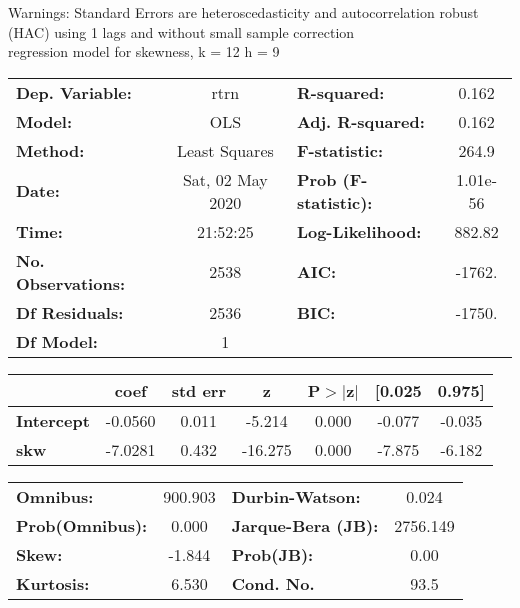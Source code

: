 Warnings: \newline
 [1] Standard Errors are heteroscedasticity and autocorrelation robust (HAC) using 1 lags and without small sample correction\\ 

regression model for skewness, k = 12 h = 9\begin{center}
\begin{tabular}{lclc}
\toprule
\textbf{Dep. Variable:}    &       rtrn       & \textbf{  R-squared:         } &     0.162   \\
\textbf{Model:}            &       OLS        & \textbf{  Adj. R-squared:    } &     0.162   \\
\textbf{Method:}           &  Least Squares   & \textbf{  F-statistic:       } &     264.9   \\
\textbf{Date:}             & Sat, 02 May 2020 & \textbf{  Prob (F-statistic):} &  1.01e-56   \\
\textbf{Time:}             &     21:52:25     & \textbf{  Log-Likelihood:    } &    882.82   \\
\textbf{No. Observations:} &        2538      & \textbf{  AIC:               } &    -1762.   \\
\textbf{Df Residuals:}     &        2536      & \textbf{  BIC:               } &    -1750.   \\
\textbf{Df Model:}         &           1      & \textbf{                     } &             \\
\bottomrule
\end{tabular}
\begin{tabular}{lcccccc}
                   & \textbf{coef} & \textbf{std err} & \textbf{z} & \textbf{P$> |$z$|$} & \textbf{[0.025} & \textbf{0.975]}  \\
\midrule
\textbf{Intercept} &      -0.0560  &        0.011     &    -5.214  &         0.000        &       -0.077    &       -0.035     \\
\textbf{skw}       &      -7.0281  &        0.432     &   -16.275  &         0.000        &       -7.875    &       -6.182     \\
\bottomrule
\end{tabular}
\begin{tabular}{lclc}
\textbf{Omnibus:}       & 900.903 & \textbf{  Durbin-Watson:     } &    0.024  \\
\textbf{Prob(Omnibus):} &   0.000 & \textbf{  Jarque-Bera (JB):  } & 2756.149  \\
\textbf{Skew:}          &  -1.844 & \textbf{  Prob(JB):          } &     0.00  \\
\textbf{Kurtosis:}      &   6.530 & \textbf{  Cond. No.          } &     93.5  \\
\bottomrule
\end{tabular}
\end{center}

